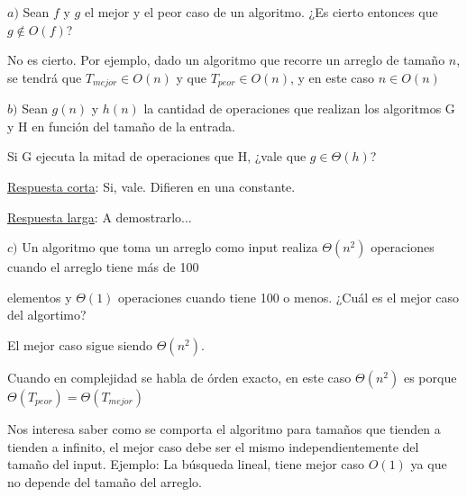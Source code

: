 \documentclass[10pt,a4paper]{article}
\begin{document}
\demoline
\demoline
\demoline
\demoline

\par $a)$ Sean \ensuremath{f} y \ensuremath{g} el mejor y el peor caso de un algoritmo. ¿Es cierto entonces que \ensuremath{g \notin O(f)}?
\demoline
\begin{groupIzq}{2.5em}
  No es cierto. Por ejemplo, dado un algoritmo que recorre un arreglo de tamaño \ensuremath{n}, se tendrá que \ensuremath{T_{mejor} \in O(n)} y que \ensuremath{T_{peor} \in O(n)}, y en este caso \ensuremath{n \in O(n)}
\end{groupIzq}

\demoline
\demoline
\par $b)$ Sean \ensuremath{g(n)} y \ensuremath{h(n)} la cantidad de operaciones que realizan los algoritmos G y H en función del tamaño de la entrada.
\par \hspace{0.90em} Si G ejecuta la mitad de operaciones que H, ¿vale que \ensuremath{g \in \Theta(h)}?
\demoline
\begin{groupIzq}{2.5em}
  \par \underline{Respuesta corta}: Si, vale. Difieren en una constante.
  \par \underline{Respuesta larga}: A demostrarlo...
\end{groupIzq}

\demoline
\demoline
\par $c)$ Un algoritmo que toma un arreglo como input realiza \ensuremath{\Theta(n^2)} operaciones cuando el arreglo tiene más de 100 \par \hspace{0.90em} elementos y \ensuremath{\Theta(1)} operaciones cuando tiene 100 o menos. ¿Cuál es el mejor caso del algortimo?
\demoline
\begin{groupIzq}{2.5em}
  \par El mejor caso sigue siendo \ensuremath{\Theta(n^2)}.
  \par Cuando en complejidad se habla de órden exacto, en este caso \ensuremath{\Theta(n^2)} es porque \ensuremath{\Theta(T_{peor}) = \Theta(T_{mejor})}
  \par Nos interesa saber como se comporta el algoritmo para tamaños que tienden a tienden a infinito, el mejor caso debe ser el mismo independientemente del tamaño del input. Ejemplo: La búsqueda lineal, tiene mejor caso \ensuremath{O(1)} ya que no depende del tamaño del arreglo.
\end{groupIzq}
\end{document}
